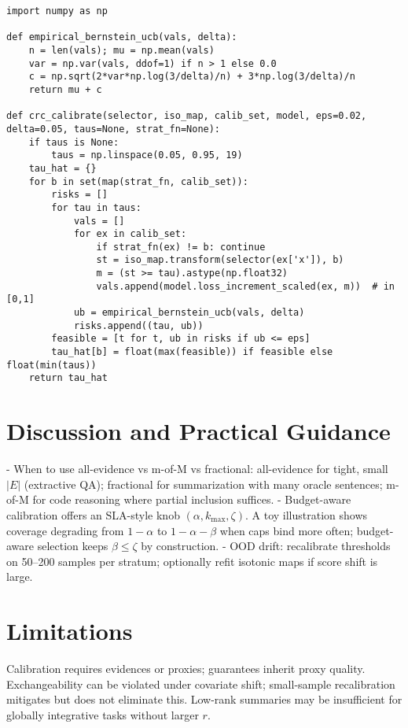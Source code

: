 \documentclass[11pt]{article}
\begin{document}
\begin{lstlisting}[style=py, caption={CRC per stratum with empirical-Bernstein UCB (loss in [0,1]).}]
import numpy as np

def empirical_bernstein_ucb(vals, delta):
    n = len(vals); mu = np.mean(vals)
    var = np.var(vals, ddof=1) if n > 1 else 0.0
    c = np.sqrt(2*var*np.log(3/delta)/n) + 3*np.log(3/delta)/n
    return mu + c

def crc_calibrate(selector, iso_map, calib_set, model, eps=0.02, delta=0.05, taus=None, strat_fn=None):
    if taus is None:
        taus = np.linspace(0.05, 0.95, 19)
    tau_hat = {}
    for b in set(map(strat_fn, calib_set)):
        risks = []
        for tau in taus:
            vals = []
            for ex in calib_set:
                if strat_fn(ex) != b: continue
                st = iso_map.transform(selector(ex['x']), b)
                m = (st >= tau).astype(np.float32)
                vals.append(model.loss_increment_scaled(ex, m))  # in [0,1]
            ub = empirical_bernstein_ucb(vals, delta)
            risks.append((tau, ub))
        feasible = [t for t, ub in risks if ub <= eps]
        tau_hat[b] = float(max(feasible)) if feasible else float(min(taus))
    return tau_hat
\end{lstlisting}

\section{Discussion and Practical Guidance}
- When to use all-evidence vs m-of-M vs fractional: all-evidence for tight, small $|E|$ (extractive QA); fractional for summarization with many oracle sentences; m-of-M for code reasoning where partial inclusion suffices.
- Budget-aware calibration offers an SLA-style knob $(\alpha,k_{\max},\zeta)$. A toy illustration shows coverage degrading from $1-\alpha$ to $1-\alpha-\beta$ when caps bind more often; budget-aware selection keeps $\beta\le\zeta$ by construction.
- OOD drift: recalibrate thresholds on 50–200 samples per stratum; optionally refit isotonic maps if score shift is large.

\section{Limitations}
Calibration requires evidences or proxies; guarantees inherit proxy quality. Exchangeability can be violated under covariate shift; small-sample recalibration mitigates but does not eliminate this. Low-rank summaries may be insufficient for globally integrative tasks without larger $r$.
\end{document}
